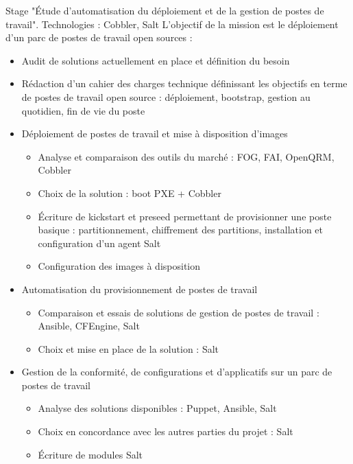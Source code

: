 \documentclass[10pt,a4paper]{moderncv}
\begin{document}
{Stage "Étude d'automatisation du déploiement et de la gestion de postes de
  travail". Technologies : Cobbler, Salt
  L'objectif de la mission est le déploiement d'un parc de postes de travail open
  sources :
  \begin{itemize}
    \item Audit de solutions actuellement en place et définition du besoin
    \item Rédaction d'un cahier des charges technique définissant les objectifs
      en terme de postes de travail open source : déploiement, bootstrap, gestion
      au quotidien, fin de vie du poste
    \item Déploiement de postes de travail et mise à disposition d'images
      \begin{itemize}
        \item Analyse et comparaison des outils du marché : FOG, FAI, OpenQRM,
          Cobbler
        \item Choix de la solution : boot PXE + Cobbler
        \item Écriture de kickstart et preseed permettant de provisionner une
          poste basique : partitionnement, chiffrement des partitions,
          installation et configuration d'un agent Salt
        \item Configuration des images à disposition
      \end{itemize}
    \item Automatisation du provisionnement de postes de travail
      \begin{itemize}
        \item Comparaison et essais de solutions de gestion de postes de travail
          : Ansible, CFEngine, Salt
        \item Choix et mise en place de la solution : Salt
      \end{itemize}
    \item Gestion de la conformité, de configurations et d'applicatifs sur un
      parc de postes de travail
      \begin{itemize}
        \item Analyse des solutions disponibles : Puppet, Ansible, Salt
        \item Choix en concordance avec les autres parties du projet : Salt
        \item Écriture de modules Salt
      \end{itemize}

\end{itemize}}
\end{document}
